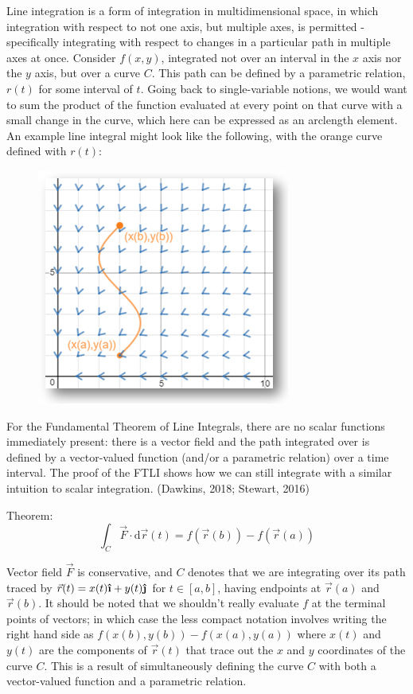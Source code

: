 \documentclass[11pt]{article}
\newcommand{\ihat}{\boldsymbol{\hat{\textbf{\i}}}}
\newcommand{\jhat}{\boldsymbol{\hat{\textbf{\j}}}}
\begin{document}
Line integration is a form of integration in multidimensional space, in which integration with respect to not one axis, but multiple axes, is permitted - specifically integrating with respect to changes in a particular path in multiple axes at once. Consider $f(x,y)$, integrated not over an interval in the $x$ axis nor the $y$ axis, but over a curve $C$. This path can be defined by a parametric relation, $r(t)$ for some interval of $t$. Going back to single-variable notions, we would want to sum the product of the function evaluated at every point on that curve with a small change in the curve, which here can be expressed as an arclength element. An example line integral might look like the following, with the orange curve defined with $r(t)$:

\begin{figure}[h]
\centering
\includegraphics[scale=0.75]{lineint}
\end{figure}

For the Fundamental Theorem of Line Integrals, there are no scalar functions immediately present: there is a vector field and the path integrated over is defined by a vector-valued function (and/or a parametric relation) over a time interval. The proof of the FTLI shows how we can still integrate with a similar intuition to scalar integration. (Dawkins, 2018; Stewart, 2016)

Theorem:
$$\int_C \vec{F}\cdot\mathrm{d}\vec{r}(t) = f(\vec{r}(b))-f(\vec{r}(a))$$

Vector field $\vec{F}$ is conservative, and $C$ denotes that we are integrating over its path traced by $\vec{r}(t) = x(t)\ihat+y(t)\jhat$ for $t\in [a,b]$, having endpoints at $\vec{r}(a)$ and $\vec{r}(b)$. It should be noted that we shouldn't really evaluate $f$ at the terminal points of vectors; in which case the less compact notation involves writing the right hand side as $f(x(b),y(b))-f(x(a),y(a))$ where $x(t)$ and $y(t)$ are the components of $\vec{r}(t)$ that trace out the $x$ and $y$ coordinates of the curve $C$. This is a result of simultaneously defining the curve $C$ with both a vector-valued function and a parametric relation.\newpage
\end{document}
